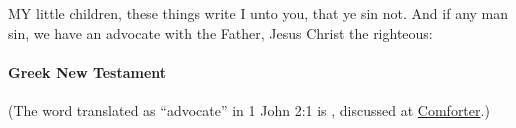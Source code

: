 			\begin{compactdesc}
				\item[{\hyperref[1JOHN-2-1]{1 John 2:1}}] MY little children, these things write I unto you, that ye sin not.  And if any man sin, we have an advocate with the Father, Jesus Christ the righteous:
			\end{compactdesc}
			
		\paragraph{Greek New Testament} %
			\label{ADVOCATE-GREEK}
			
			(The word translated as ``advocate'' in 1 John 2:1 is \hyperref[PARAKLETOS]{}, discussed at \hyperref[COMFORTER]{Comforter}.)
		
			
				
				
				
